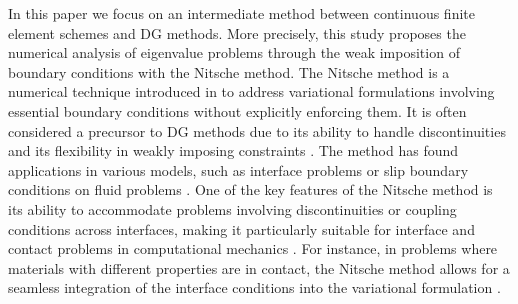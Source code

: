 \documentclass[onefignum,onetabnum,final]{siamart250211}
\numberwithin{equation}{section}
\newcommand\0{\boldsymbol{0}}
\begin{document}
	In this paper we focus on an intermediate method between continuous finite element schemes and DG methods. More precisely, this study proposes the numerical analysis of eigenvalue problems through the weak imposition of boundary conditions with the Nitsche method. 	The Nitsche method is a numerical technique introduced in \cite{nitsche1971variationsprinzip} to address variational formulations involving essential boundary conditions without explicitly enforcing them. It is often considered a precursor to DG methods due to its ability to handle discontinuities and its flexibility in weakly imposing constraints \cite{arnold2002unified,juntunen2009nitsche,burman2012penalty}. The method has found applications in various models, such as  interface problems or slip boundary conditions on fluid problems \cite{hansbo2005nitsche,MR4744101}. One of the key features of the Nitsche method is its ability to accommodate problems involving discontinuities or coupling conditions across interfaces, making it particularly suitable for interface and contact problems in computational mechanics \cite{hansbo2002discontinuous,chouly2015symmetric,chouly2015nitsche,chouly2020hybrid}. For instance, in problems where materials with different properties are in contact, the Nitsche method allows for a seamless integration of the interface conditions into the variational formulation \cite{chouly2018unbiased,burman2020nitsche}.
	
\end{document}
